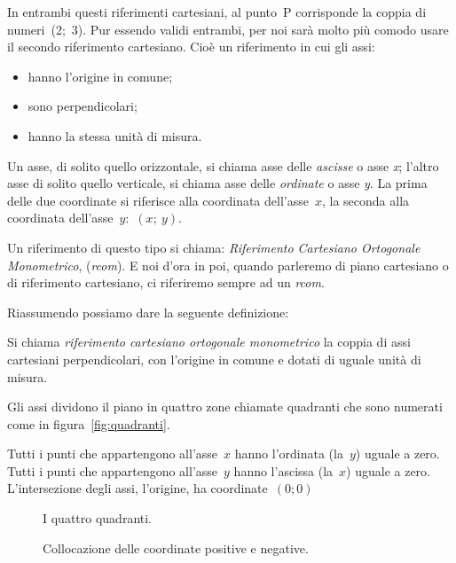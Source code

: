 In entrambi questi riferimenti cartesiani, al punto~P corrisponde la coppia
di numeri~(2;~3). Pur essendo validi entrambi, per noi sarà molto più comodo 
usare il secondo riferimento cartesiano. Cioè un riferimento in cui gli assi:

\begin{itemize} [noitemsep]
 \item hanno l'origine in comune;
 \item sono perpendicolari;
 \item hanno la stessa unità di misura.
\end{itemize}

Un asse, di solito quello orizzontale, si chiama asse delle \emph{ascisse} 
o asse \emph{x}; l'altro asse di solito quello verticale, si chiama asse 
delle \emph{ordinate} o asse \emph{y}. La prima delle due coordinate
si riferisce alla coordinata dell'asse~$x$, la seconda alla coordinata 
dell'asse~$y$:~$(x;~y)$.

Un riferimento di questo tipo si chiama: 
\emph{Riferimento Cartesiano Ortogonale Monometrico}, (\emph{rcom}). 
E noi d'ora in poi, quando parleremo di piano cartesiano o di riferimento 
cartesiano, ci riferiremo sempre ad un \emph{rcom}.

Riassumendo possiamo dare la seguente definizione:

\begin{definizione}
Si chiama \emph{riferimento cartesiano ortogonale monometrico} 
la coppia di assi cartesiani perpendicolari, con l'origine in comune e 
dotati di uguale unità di misura.
\end{definizione}

Gli assi dividono il piano in quattro zone chiamate quadranti che sono 
numerati come in figura~\ref{fig:quadranti}.

Tutti i punti che appartengono all'asse~$x$ hanno l'ordinata (la~$y$) uguale 
a zero.
Tutti i punti che appartengono all'asse~$y$ hanno l'ascissa (la~$x$) uguale 
a zero.
L'intersezione degli assi, l'origine, ha coordinate~$(0; 0)$

\begin{inaccessibleblock}
 \begin{figure}[h]
 \centering
 \begin{minipage}[t]{.45\textwidth}
 \centering \pianoconquadranti
 \caption{I quattro quadranti.}\label{fig:quadranti}
 \end{minipage}\hfil
 \begin{minipage}[t]{.45\textwidth}
 \centering \pianoconsegni
 \caption{Collocazione delle coordinate positive e negative.}
 \label{fig:segni}
 \end{minipage}
\end{figure}
\end{inaccessibleblock}

